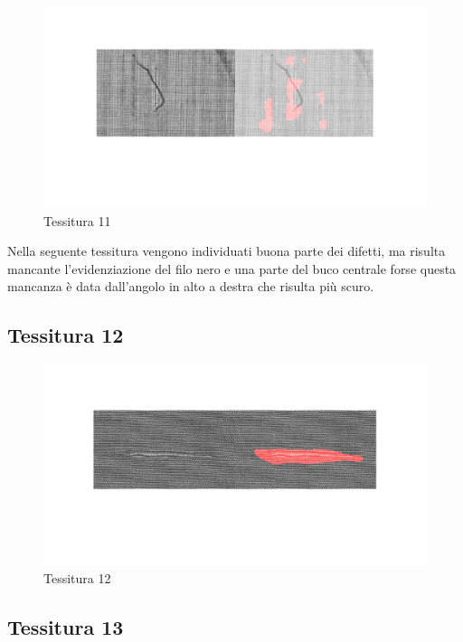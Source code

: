 \documentclass{article}
\begin{document}
\begin{figure}[h!]
	\centering
	\includegraphics[width=\textwidth]{results/res11.jpg}
	\caption{Tessitura 11}
\end{figure}

Nella seguente tessitura vengono individuati buona parte dei difetti, ma risulta mancante l'evidenziazione del filo nero e una parte del buco centrale forse questa mancanza è data dall'angolo in alto a destra che risulta più scuro.

\subsection{Tessitura 12}

\begin{figure}[h!]
	\centering
	\includegraphics[width=\textwidth]{results/res12.jpg}
	\caption{Tessitura 12}
\end{figure}

\subsection{Tessitura 13}
\end{document}
